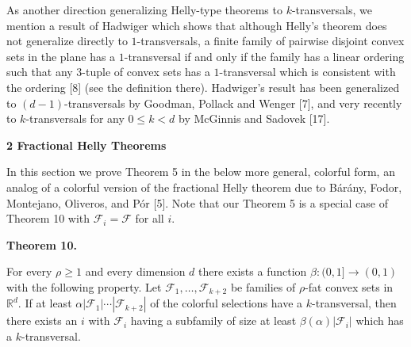 \documentclass[10pt,a4paper]{amsart}
\begin{document}
\par
\par
As another direction generalizing Helly-type theorems to $k$-transversals, we mention a result of Hadwiger which shows that although Helly’s theorem does not generalize directly to $1$-transversals, a finite family of pairwise disjoint convex sets in the plane has a $1$-transversal if and only if the family has a linear ordering such that any $3$-tuple of convex sets has a $1$-transversal which is consistent with the ordering [8] (see the definition there). Hadwiger’s result has been generalized to $(d-1)$-transversals by Goodman, Pollack and Wenger [7], and very recently to $k$-transversals for any $0\leq k<d$ by McGinnis and Sadovek [17].
\par
\par
\par\medskip\noindent\textbf{2 Fractional Helly Theorems}\par
In this section we prove Theorem 5 in the below more general, colorful form, an analog of a colorful version of the fractional Helly theorem due to Bárány, Fodor, Montejano, Oliveros, and Pór [5]. Note that our Theorem 5 is a special case of Theorem 10 with $\mathcal{F}_{i}=\mathcal{F}$ for all $i$.
\par
\par

\par\medskip\noindent\textbf{Theorem 10.}\par
For every $\rho\geq 1$ and every dimension $d$ there exists a function $\beta:(0,1]\to(0,1)$ with the following property. Let $\mathcal{F}_{1},\ldots,\mathcal{F}_{k+2}$ be families of $\rho$-fat convex sets in $\mathbb{R}^{d}$. If at least $\alpha|\mathcal{F}_{1}|\cdots|\mathcal{F}_{k+2}|$ of the colorful selections have a $k$-transversal, then there exists an $i$ with $\mathcal{F}_{i}$ having a subfamily of size at least $\beta(\alpha)|\mathcal{F}_{i}|$ which has a $k$-transversal.
\par
\par
\par
\end{document}
